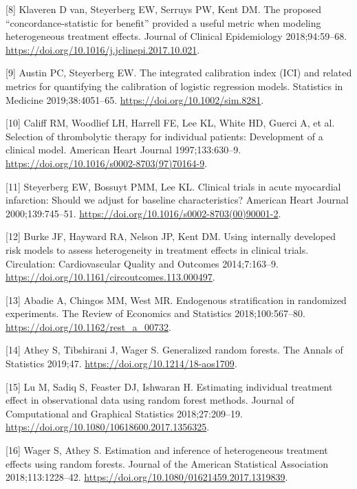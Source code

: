 \documentclass{article}
\newenvironment{cslreferences}%
  {}%
  {\par}
\begin{document}
\begin{cslreferences}
\leavevmode\hypertarget{ref-vanKlaveren2018}{}%
{[}8{]} Klaveren D van, Steyerberg EW, Serruys PW, Kent DM. The proposed
``concordance-statistic for benefit'' provided a useful metric when
modeling heterogeneous treatment effects. Journal of Clinical
Epidemiology 2018;94:59--68.
\url{https://doi.org/10.1016/j.jclinepi.2017.10.021}.

\leavevmode\hypertarget{ref-Austin2019}{}%
{[}9{]} Austin PC, Steyerberg EW. The integrated calibration index (ICI)
and related metrics for quantifying the calibration of logistic
regression models. Statistics in Medicine 2019;38:4051--65.
\url{https://doi.org/10.1002/sim.8281}.

\leavevmode\hypertarget{ref-Califf1997}{}%
{[}10{]} Califf RM, Woodlief LH, Harrell FE, Lee KL, White HD, Guerci A,
et al. Selection of thrombolytic therapy for individual patients:
Development of a clinical model. American Heart Journal 1997;133:630--9.
\url{https://doi.org/10.1016/s0002-8703(97)70164-9}.

\leavevmode\hypertarget{ref-Steyerberg2000}{}%
{[}11{]} Steyerberg EW, Bossuyt PMM, Lee KL. Clinical trials in acute
myocardial infarction: Should we adjust for baseline characteristics?
American Heart Journal 2000;139:745--51.
\url{https://doi.org/10.1016/s0002-8703(00)90001-2}.

\leavevmode\hypertarget{ref-Burke2014}{}%
{[}12{]} Burke JF, Hayward RA, Nelson JP, Kent DM. Using internally
developed risk models to assess heterogeneity in treatment effects in
clinical trials. Circulation: Cardiovascular Quality and Outcomes
2014;7:163--9. \url{https://doi.org/10.1161/circoutcomes.113.000497}.

\leavevmode\hypertarget{ref-Abadie2018}{}%
{[}13{]} Abadie A, Chingos MM, West MR. Endogenous stratification in
randomized experiments. The Review of Economics and Statistics
2018;100:567--80. \url{https://doi.org/10.1162/rest_a_00732}.

\leavevmode\hypertarget{ref-Athey2019}{}%
{[}14{]} Athey S, Tibshirani J, Wager S. Generalized random forests. The
Annals of Statistics 2019;47. \url{https://doi.org/10.1214/18-aos1709}.

\leavevmode\hypertarget{ref-Lu2018}{}%
{[}15{]} Lu M, Sadiq S, Feaster DJ, Ishwaran H. Estimating individual
treatment effect in observational data using random forest methods.
Journal of Computational and Graphical Statistics 2018;27:209--19.
\url{https://doi.org/10.1080/10618600.2017.1356325}.

\leavevmode\hypertarget{ref-Wager2018}{}%
{[}16{]} Wager S, Athey S. Estimation and inference of heterogeneous
treatment effects using random forests. Journal of the American
Statistical Association 2018;113:1228--42.
\url{https://doi.org/10.1080/01621459.2017.1319839}.
\end{cslreferences}

\setlength{\parindent}{0in}
\setlength{\leftskip}{0in}

\noindent



\end{document}
